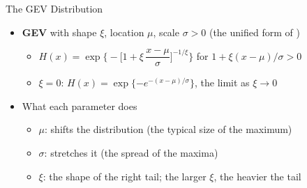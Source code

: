 \begin{frame}{The GEV Distribution}
\itemsize{\small}
\begin{itemize}
    \item \textbf{GEV} with shape $\xi$, location $\mu$, scale $\sigma > 0$ (the unified form of )
    \begin{itemize}
        \item $H(x) = \exp\Big\{-\Big[1 + \xi\,\dfrac{x - \mu}{\sigma}\Big]^{-1/\xi}\Big\}$ for $1 + \xi(x - \mu)/\sigma > 0$
        \item $\xi = 0$: $H(x) = \exp\{-e^{-(x - \mu)/\sigma}\}$, the limit as $\xi \to 0$
    \end{itemize}
    \item What each parameter does
    \begin{itemize}
        \item $\mu$: shifts the distribution (the typical size of the maximum)
        \item $\sigma$: stretches it (the spread of the maxima)
        \item $\xi$: the shape of the right tail; the larger $\xi$, the heavier the tail
    \end{itemize}
\end{itemize}
\end{frame}

